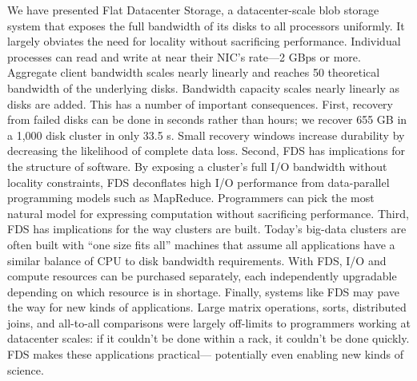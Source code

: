 We have presented Flat Datacenter Storage, a
datacenter-scale blob storage system that exposes the full
bandwidth of its disks to all processors uniformly. It
largely obviates the need for locality without sacrificing
performance. Individual processes can read and write at
near their NIC’s rate—2 GBps or more. Aggregate client
bandwidth scales nearly linearly and reaches 50%
theoretical bandwidth of the underlying disks. Bandwidth capacity scales nearly linearly as disks are added.
This has a number of important consequences. First,
recovery from failed disks can be done in seconds rather
than hours; we recover 655 GB in a 1,000 disk cluster in
only 33.5 s. Small recovery windows increase durability
by decreasing the likelihood of complete data loss.
Second, FDS has implications for the structure of software. By exposing a cluster’s full I/O bandwidth without locality constraints, FDS deconflates high I/O performance from data-parallel programming models such
as MapReduce. Programmers can pick the most natural model for expressing computation without sacrificing
performance.
Third, FDS has implications for the way clusters are
built. Today’s big-data clusters are often built with “one
size fits all” machines that assume all applications have a
similar balance of CPU to disk bandwidth requirements.
With FDS, I/O and compute resources can be purchased
separately, each independently upgradable depending on
which resource is in shortage.
Finally, systems like FDS may pave the way for new
kinds of applications. Large matrix operations, sorts,
distributed joins, and all-to-all comparisons were largely
off-limits to programmers working at datacenter scales:
if it couldn’t be done within a rack, it couldn’t be
done quickly. FDS makes these applications practical—
potentially even enabling new kinds of science.

